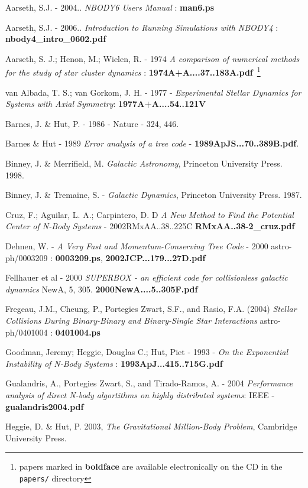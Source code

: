 Aarseth, S.J. - 2004.. {\it NBODY6 Users Manual} : {\bf man6.ps}

Aarseth, S.J. - 2006.. {\it Introduction to Running Simulations with NBODY4} : 
{\bf nbody4\_intro\_0602.pdf}


Aarseth, S. J.; Henon, M.; Wielen, R. - 1974
{\it A comparison of numerical methods for the study of star cluster 
dynamics} : {\bf 1974A+A....37..183A.pdf}~\footnote{papers marked 
in {\bf boldface} are available electronically on the CD in the {\tt papers/} directory}

van Albada, T. S.; van Gorkom, J. H.	- 1977 -
{\it Experimental Stellar Dynamics for Systems with Axial Symmetry}:
{\bf 1977A+A....54..121V}



Barnes, J. \& Hut, P. - 1986 - Nature - 324, 446.

Barnes \& Hut - 1989
{\it Error analysis of a tree code} - {\bf 1989ApJS...70..389B.pdf}.

Binney, J. \& Merrifield, M. {\it Galactic Astronomy}, Princeton University Press. 1998.

Binney, J. \& Tremaine, S. - {\it Galactic Dynamics}, Princeton University Press. 1987. 

Cruz, F.; Aguilar, L. A.; Carpintero, D. D
{\it A New Method to Find the Potential Center of N-Body Systems} - 2002RMxAA..38..225C
{\bf RMxAA..38-2\_cruz.pdf}

Dehnen, W. - {\it A Very Fast and Momentum-Conserving Tree Code} - 2000
astro-ph/0003209 : {\bf 0003209.ps}, {\bf 2002JCP...179...27D.pdf}

Fellhauer et al - 2000 
{\it SUPERBOX - an efficient code for collisionless galactic dynamics}
NewA, 5, 305. {\bf 2000NewA....5..305F.pdf} 

Fregeau, J.M., Cheung, P., Portegies Zwart, S.F., and Rasio, F.A. (2004)
{\it Stellar Collisions During Binary-Binary and Binary-Single Star Interactions}
astro-ph/0401004 : {\bf 0401004.ps}

Goodman, Jeremy; Heggie, Douglas C.; Hut, Piet - 1993 -
{\it On the Exponential Instability of N-Body Systems} :
{\bf 1993ApJ...415..715G.pdf}

Gualandris, A., Portegies Zwart, S., and Tirado-Ramos, A. - 2004
{\it Performance analysis of direct N-body algortithms on highly distributed systems}:
IEEE - {\bf gualandris2004.pdf}

Heggie, D. \& Hut, P. 2003, 
{\it The Gravitational Million-Body Problem}, 
Cambridge University Press.

